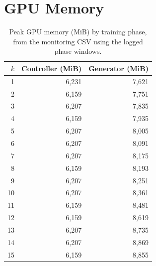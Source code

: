 \documentclass[11pt]{article}
\begin{document}
\section{GPU Memory}
\begin{table}[H]\centering
\caption{Peak GPU memory (MiB) by training phase, from the monitoring CSV using the logged phase windows.}
\label{tab:gpu}
\begin{tabular}{rrr}\toprule $k$ & Controller (MiB) & Generator (MiB) \\ \midrule
1 & 6,231 & 7,621 \\
2 & 6,159 & 7,751 \\
3 & 6,207 & 7,835 \\
4 & 6,159 & 7,935 \\
5 & 6,207 & 8,005 \\
6 & 6,207 & 8,091 \\
7 & 6,207 & 8,175 \\
8 & 6,159 & 8,193 \\
9 & 6,207 & 8,251 \\
10 & 6,207 & 8,361 \\
11 & 6,159 & 8,481 \\
12 & 6,159 & 8,619 \\
13 & 6,207 & 8,735 \\
14 & 6,207 & 8,869 \\
15 & 6,159 & 8,855 \\
\bottomrule\end{tabular}\end{table}
\end{document}
